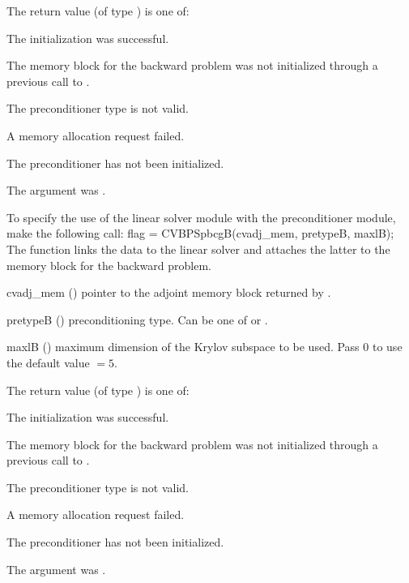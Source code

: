 {
  The return value  (of type ) is one of:
  \begin{args}
  \item[\Id{CVSPGMR\_SUCCESS}]
    The {\cvspgmr} initialization was successful.
  \item[\Id{CVSPGMR\_MEM\_NULL}]
    The {\cvodes} memory block for the backward problem was not initialized through a 
    previous call to .
  \item[\Id{CVSPGMR\_ILL\_INPUT}]
    The preconditioner type  is not valid.
  \item[\Id{CVSPGMR\_MEM\_FAIL}]
    A memory allocation request failed.
  \item[\Id{CVBANDPRE\_PDATA\_NULL}]
    The {\cvbandpre} preconditioner has not been initialized.
  \item[\Id{CVBANDPRE\_ADJMEM\_NULL}]
    The  argument was .
  \end{args}
}
{}
To specify the use of the {\cvspbcg} linear solver module with the {\cvbandpre} 
preconditioner module, make the following call:
{
  flag = CVBPSpbcgB(cvadj\_mem, pretypeB, maxlB);
}
{
  The function  links the {\cvbandpre} data to the
  {\cvspbcg} linear solver and attaches the latter to the {\cvodes}
  memory block for the backward problem.
}
{
  \begin{args}
  \item[cvadj\_mem] ()
    pointer to the adjoint memory block returned by .
  \item[pretypeB] ()
    preconditioning type. Can be one of  or .
  \item[maxlB] ()
    maximum dimension of the Krylov subspace to be used. Pass $0$ to use the 
    default value $=5$.
  \end{args}
}
{
  The return value  (of type ) is one of:
  \begin{args}
  \item[\Id{CVSPBCG\_SUCCESS}]
    The {\cvspbcg} initialization was successful.
  \item[\Id{CVSPBCG\_MEM\_NULL}]
    The {\cvodes} memory block for the backward problem was not initialized through a 
    previous call to .
  \item[\Id{CVSPBCG\_ILL\_INPUT}]
    The preconditioner type  is not valid.
  \item[\Id{CVSPBCG\_MEM\_FAIL}]
    A memory allocation request failed.
  \item[\Id{CVBANDPRE\_PDATA\_NULL}]
    The {\cvbandpre} preconditioner has not been initialized.
  \item[\Id{CVBANDPRE\_ADJMEM\_NULL}]
    The  argument was .
  \end{args}
}
